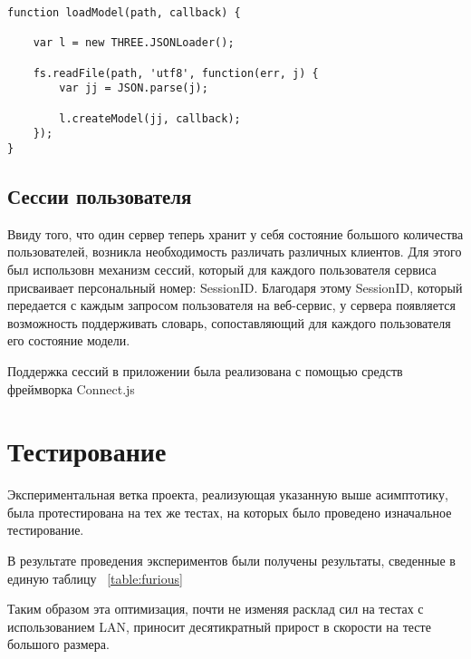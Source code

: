 \begin{lstlisting}
function loadModel(path, callback) {

    var l = new THREE.JSONLoader();

    fs.readFile(path, 'utf8', function(err, j) {
        var jj = JSON.parse(j);

        l.createModel(jj, callback);
    });
}
\end{lstlisting}

\subsection{Сессии пользователя}

Ввиду того, что один сервер теперь хранит у себя состояние большого количества
пользователей, возникла необходимость различать различных клиентов. Для этого
был использовн механизм сессий, который для каждого пользователя сервиса
присваивает персональный номер: SessionID. Благодаря этому SessionID, который
передается с каждым запросом пользователя на веб-сервис, у сервера появляется
возможность поддерживать словарь, сопоставляющий для каждого пользователя его
состояние модели.

Поддержка сессий в приложении была реализована с помощью средств фреймворка
Connect.js

\section{Тестирование}

Экспериментальная ветка проекта, реализующая указанную выше асимптотику, была
протестирована на тех же тестах, на которых было проведено изначальное
тестирование.

В результате проведения экспериментов были получены результаты,
сведенные в единую таблицу ~\ref{table:furious}

\begin{table}[ht]
\begin{center}
\end{center}
\caption{Задержка оптимизированных серверных вычислений}
\label{table:furious}
\end{table}

Таким образом эта оптимизация, почти не изменяя расклад сил на тестах с
использованием LAN, приносит десятикратный прирост в скорости на тесте большого
размера.

